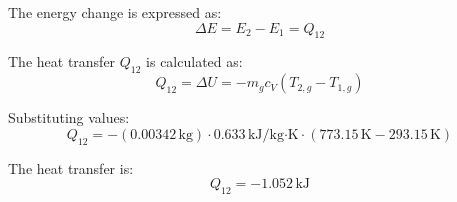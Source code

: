 The energy change is expressed as:  
\[
\Delta E = E_2 - E_1 = Q_{12}
\]  

The heat transfer \( Q_{12} \) is calculated as:  
\[
Q_{12} = \Delta U = -m_g c_V (T_{2,g} - T_{1,g})
\]  

Substituting values:  
\[
Q_{12} = -(0.00342 \, \text{kg}) \cdot 0.633 \, \text{kJ/kg·K} \cdot (773.15 \, \text{K} - 293.15 \, \text{K})
\]  

The heat transfer is:  
\[
Q_{12} = -1.052 \, \text{kJ}
\]